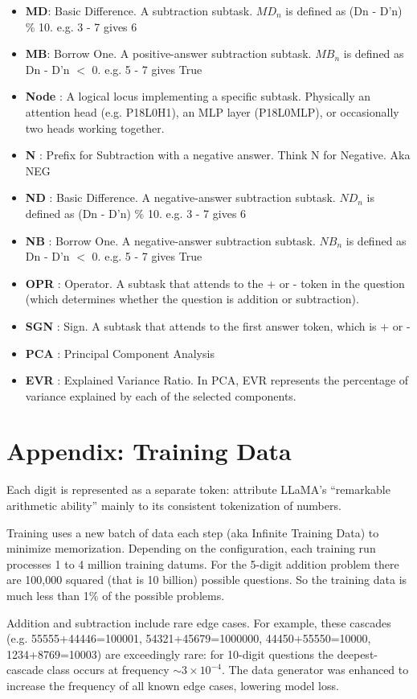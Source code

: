 \documentclass[11pt]{article}
\begin{document}
\begin{itemize}
\item \textbf{MD}: Basic Difference. A subtraction subtask. $MD_n$ is defined as (Dn - D'n) \% 10. e.g. 3 - 7 gives 6
\item \textbf{MB}: Borrow One. A positive-answer subtraction subtask. $MB_n$ is defined as Dn - D'n $<$ 0. e.g. 5 - 7 gives True
\item \textbf{Node} : A logical locus implementing a specific subtask. Physically an attention head (e.g. P18L0H1), an MLP layer (P18L0MLP), or occasionally two heads working together.
\item \textbf{N} : Prefix for Subtraction with a negative answer. Think N for Negative. Aka NEG
\item \textbf{ND} : Basic Difference. A negative-answer subtraction subtask. $ND_n$ is defined as (Dn - D'n) \% 10. e.g. 3 - 7 gives 6
\item \textbf{NB} : Borrow One. A negative-answer subtraction subtask. $NB_n$ is defined as Dn - D'n $<$ 0. e.g. 5 - 7 gives True
\item \textbf{OPR} : Operator. A subtask that attends to the + or - token in the question (which determines whether the question is addition or subtraction).
\item \textbf{SGN} : Sign. A subtask that attends to the first answer token, which is + or -
\item \textbf{PCA} : Principal Component Analysis
\item \textbf{EVR} : Explained Variance Ratio. In PCA, EVR represents the percentage of variance explained by each of the selected components.
\end{itemize}

\section{Appendix: Training Data}
\label{app:TrainingData}
Each digit is represented as a separate token: \citet{liu2023goat} attribute LLaMA's ``remarkable arithmetic ability'' mainly to its consistent tokenization of numbers.

Training uses a new batch of data each step (aka Infinite Training Data) to minimize memorization. Depending on the configuration, each training run processes 1 to 4 million training datums. For the 5-digit addition problem there are 100,000 squared (that is 10 billion) possible questions. So the training data is much less than 1\% of the possible problems.

Addition and subtraction include rare edge cases. For example, these cascades (e.g. 55555+44446=100001, 54321+45679=1000000,
44450+55550=10000, 1234+8769=10003) are exceedingly rare: for 10-digit questions the deepest-cascade class occurs at frequency
${\sim}3\times10^{-4}$. The data generator was enhanced to increase the frequency of all known edge cases, lowering model loss.
\end{document}
